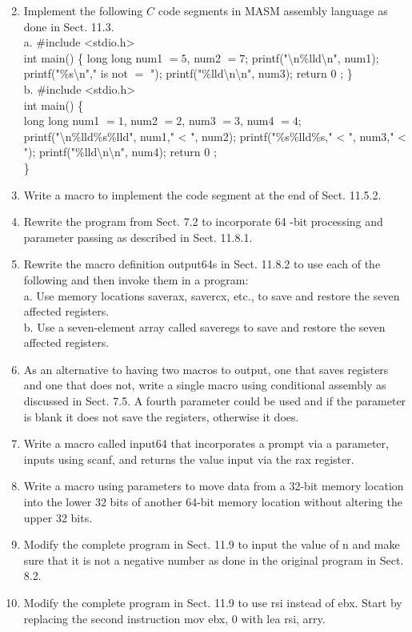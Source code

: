 \documentclass[10pt]{book}
\begin{document}
\begin{center}
\begin{center}
\begin{center}
\begin{center}
\begin{enumerate}
  \setcounter{enumi}{1}
  \item Implement the following $C$ code segments in MASM assembly language as done in Sect. 11.3.\\
a. \#include <stdio.h>\\
int main() \{ long long num1 $=5$, num2 $=7$; printf("\textbackslash n\%lld\textbackslash n", num1); printf("\%s\textbackslash n"," is not $=$ "); printf("\%lld\textbackslash n\textbackslash n", num3); return 0 ; \}\\
b. \#include <stdio.h>\\
int main() \{\\
long long num1 $=1$, num2 $=2$, num3 $=3$, num4 $=4$; printf("\textbackslash n\%lld\%s\%lld", num1," < ", num2); printf("\%s\%lld\%s," < ", num3," < "); printf("\%lld\textbackslash n\textbackslash n", num4); return 0 ;\\
\}
  \item Write a macro to implement the code segment at the end of Sect. 11.5.2.
  \item Rewrite the program from Sect. 7.2 to incorporate 64 -bit processing and parameter passing as described in Sect. 11.8.1.
  \item Rewrite the macro definition output64s in Sect. 11.8.2 to use each of the following and then invoke them in a program:\\
a. Use memory locations saverax, savercx, etc., to save and restore the seven affected registers.\\
b. Use a seven-element array called saveregs to save and restore the seven affected registers.
  \item As an alternative to having two macros to output, one that saves registers and one that does not, write a single macro using conditional assembly as discussed in Sect. 7.5. A fourth parameter could be used and if the parameter is blank it does not save the registers, otherwise it does.
  \item Write a macro called input64 that incorporates a prompt via a parameter, inputs using scanf, and returns the value input via the rax register.
  \item Write a macro using parameters to move data from a 32-bit memory location into the lower 32 bits of another 64-bit memory location without altering the upper 32 bits.
  \item Modify the complete program in Sect. 11.9 to input the value of n and make sure that it is not a negative number as done in the original program in Sect. 8.2.
  \item Modify the complete program in Sect. 11.9 to use rsi instead of ebx. Start by replacing the second instruction mov ebx, 0 with lea rsi, arry.
\end{enumerate}


\end{center}
\end{center}
\end{center}
\end{center}
\end{document}
